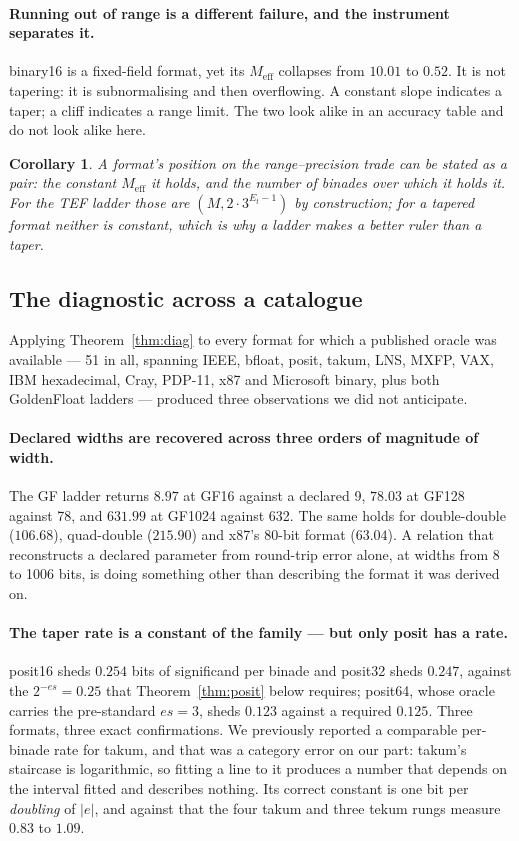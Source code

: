 \documentclass[11pt]{article}
\newtheorem{corollary}{Corollary}
\theoremstyle{definition}
\begin{document}
\paragraph{Running out of range is a different failure, and the instrument
separates it.} binary16 is a fixed-field format, yet its $M_{\mathrm{eff}}$
collapses from $10.01$ to $0.52$. It is not tapering: it is subnormalising and
then overflowing. A constant slope indicates a taper; a cliff indicates a range
limit. The two look alike in an accuracy table and do not look alike here.

\begin{corollary}
A format's position on the range--precision trade can be stated as a pair: the
constant $M_{\mathrm{eff}}$ it holds, and the number of binades over which it
holds it. For the TEF ladder those are $(M, 2\cdot 3^{E_t - 1})$ by construction;
for a tapered format neither is constant, which is why a ladder makes a better
ruler than a taper.
\end{corollary}


\subsection{The diagnostic across a catalogue}\label{sec:catalogue}

Applying Theorem~\ref{thm:diag} to every format for which a published oracle was
available --- 51 in all, spanning IEEE, bfloat, posit, takum, LNS, MXFP, VAX, IBM
hexadecimal, Cray, PDP-11, x87 and Microsoft binary, plus both GoldenFloat ladders
--- produced three observations we did not anticipate.

\paragraph{Declared widths are recovered across three orders of magnitude of
width.} The GF ladder returns $8.97$ at GF16 against a declared 9, $78.03$ at
GF128 against 78, and $631.99$ at GF1024 against 632. The same holds for
double-double ($106.68$), quad-double ($215.90$) and x87's 80-bit format
($63.04$). A relation that reconstructs a declared parameter from round-trip error
alone, at widths from 8 to 1006 bits, is doing something other than describing the
format it was derived on.

\paragraph{The taper rate is a constant of the family --- but only posit has a
rate.} posit16 sheds $0.254$ bits of significand per binade and posit32 sheds
$0.247$, against the $2^{-es} = 0.25$ that Theorem~\ref{thm:posit} below requires;
posit64, whose oracle carries the pre-standard $es = 3$, sheds $0.123$ against a
required $0.125$. Three formats, three exact confirmations. We previously reported
a comparable per-binade rate for takum, and that was a category error on our part:
takum's staircase is logarithmic, so fitting a line to it produces a number that
depends on the interval fitted and describes nothing. Its correct constant is one
bit per \emph{doubling} of $|e|$, and against that the four takum and three tekum
rungs measure $0.83$ to $1.09$.
\end{document}
